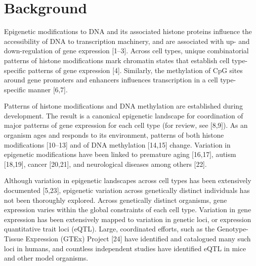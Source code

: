 \documentclass{bmcart}
\begin{document}

\section*{Background}
Epigenetic modifications to DNA and its associated histone proteins
influence the accessibility of DNA to transcription machinery, and are
associated with up- and down-regulation of gene expression {[}1--3{]}.
Across cell types, unique combinatorial patterns of histone
modifications mark chromatin states that establish cell type-specific
patterns of gene expression {[}4{]}. Similarly, the methylation of CpG
sites around gene promoters and enhancers influences transcription in a
cell type-specific manner {[}6,7{]}.

Patterns of histone modifications and DNA methylation are established
during development. The result is a canonical epigenetic landscape for
coordination of major patterns of gene expression for each cell type
(for review, see {[}8,9{]}). As an organism ages and responds to its
environment, patterns of both histone modifications {[}10--13{]} and of
DNA methylation {[}14,15{]} change. Variation in epigenetic
modifications have been linked to premature aging {[}16,17{]}, autism
{[}18,19{]}, cancer {[}20,21{]}, and neurological diseases among others
{[}22{]}.

Although variation in epigenetic landscapes across cell types has been
extensively documented {[}5,23{]}, epigenetic variation across
genetically distinct individuals has not been thoroughly explored.
Across genetically distinct organisms, gene expression varies within the
global constraints of each cell type. Variation in gene expression has
been extensively mapped to variation in genetic loci, or expression
quantitative trait loci (eQTL). Large, coordinated efforts, such as the
Genotype-Tissue Expression (GTEx) Project {[}24{]} have identified and
catalogued many such loci in humans, and countless independent studies
have identified eQTL in mice and other model organisms.
\end{document}
